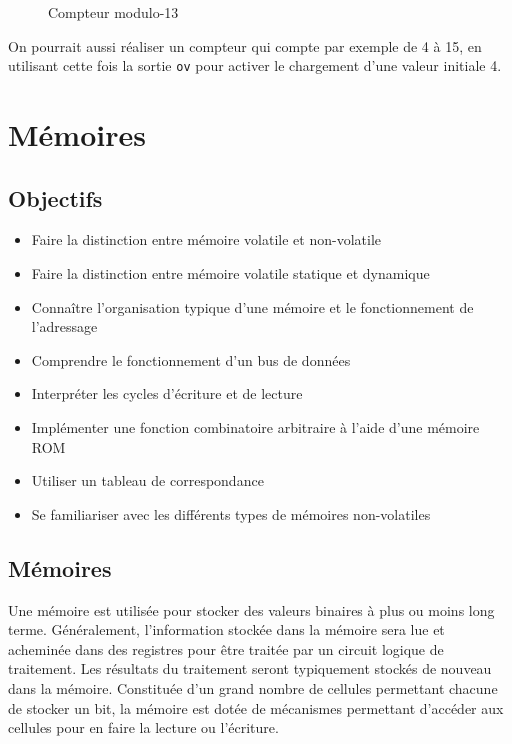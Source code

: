 \documentclass[11pt]{article}
\begin{document}
\begin{figure}[htbp]
\centering

\caption{\label{fig:org336a60e}Compteur modulo-13}
\end{figure}

On pourrait aussi réaliser un compteur qui compte par exemple de 4 à
15, en utilisant cette fois la sortie \texttt{ov} pour activer le chargement
d'une valeur initiale 4.

\section{Mémoires}
\label{sec:org5d50e88}
\subsection{Objectifs}
\label{sec:org0c71e0e}
\begin{itemize}
\item Faire la distinction entre mémoire volatile et non-volatile
\item Faire la distinction entre mémoire volatile statique et dynamique
\item Connaître l'organisation typique d'une mémoire et le fonctionnement
de l'adressage
\item Comprendre le fonctionnement d'un bus de données
\item Interpréter les cycles d'écriture et de lecture
\item Implémenter une fonction combinatoire arbitraire à l'aide d'une
mémoire ROM
\item Utiliser un tableau de correspondance
\item Se familiariser avec les différents types de mémoires non-volatiles
\end{itemize}

\subsection{Mémoires}
\label{sec:org9b1ade8}

Une mémoire est utilisée pour stocker des valeurs binaires à plus ou
moins long terme. Généralement, l'information stockée dans la mémoire
sera lue et acheminée dans des registres pour être traitée par un
circuit logique de traitement. Les résultats du traitement seront
typiquement stockés de nouveau dans la mémoire. Constituée d'un grand
nombre de cellules permettant chacune de stocker un bit, la mémoire
est dotée de mécanismes permettant d'accéder aux cellules pour en
faire la lecture ou l'écriture.
\end{document}
